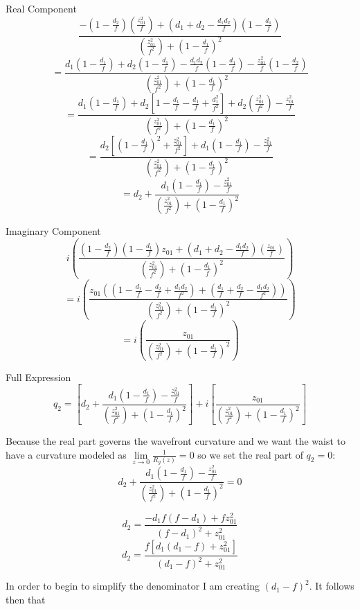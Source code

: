 \documentclass[11pt, letterpaper]{article}
\begin{document}
\begin{enumerate}
\begin{enumerate}
Real Component
$$ \frac{-\left(1-\frac{d_2}{f}\right)\left(\frac{z_{01}^2}{f}\right)+\left(d_1+d_2-\frac{d_1d_2}{f}\right)\left(1-\frac{d_1}{f}\right)}{\left(\frac{z_{01}^2}{f^2}\right)+\left(1-\frac{d_1}{f}\right)^2} $$
$$= \frac{d_1\left(1 - \frac{d_1}{f}\right) + d_2\left(1 - \frac{d_1}{f}\right) - \frac{d_1 d_2}{f}\left(1 - \frac{d_1}{f}\right) - \frac{z_{01}^2}{f}\left(1 - \frac{d_2}{f}\right)}{\left(\frac{z_{01}^2}{f^2}\right)+\left(1-\frac{d_1}{f}\right)^2}$$
$$=\frac{d_1\left(1 - \frac{d_1}{f}\right)+d_2\left[1 - \frac{d_1}{f} - \frac{d_1}{f} + \frac{d_1^2}{f^2}\right] + d_2\left(\frac{z_{01}^2}{f^2}\right) - \frac{z_{01}^2}{f}}{\left(\frac{z_{01}^2}{f^2}\right)+\left(1-\frac{d_1}{f}\right)^2}$$
$$=\frac{d_2\left[\left(1 - \frac{d_1}{f}\right)^2 + \frac{z_{01}^2}{f^2}\right] + d_1\left(1 - \frac{d_1}{f}\right) - \frac{z_{01}^2}{f}}{\left(\frac{z_{01}^2}{f^2}\right)+\left(1-\frac{d_1}{f}\right)^2}$$
$$= d_2 + \frac{d_1\left(1 - \frac{d_1}{f}\right) - \frac{z_{01}^2}{f}}{\left(\frac{z_{01}^2}{f^2}\right)+\left(1-\frac{d_1}{f}\right)^2}$$


Imaginary Component
$$i\left(\frac{\left(1-\frac{d_2}{f}\right)\left(1-\frac{d_1}{f}\right)z_{01}+\left(d_1+d_2-\frac{d_1d_2}{f}\right)\left(\frac{z_{01}}{f}\right)}{\left(\frac{z_{01}^2}{f^2}\right)+\left(1-\frac{d_1}{f}\right)^2}\right)$$
$$=i\left(\frac{z_{01}\left(\left(1-\frac{d_1}{f}-\frac{d_2}{f}+\frac{d_1d_2}{f^2}\right)+\left(\frac{d_1}{f}+\frac{d_2}{f}-\frac{d_1d_2}{f^2}\right)\right)}{\left(\frac{z_{01}^2}{f^2}\right)+\left(1-\frac{d_1}{f}\right)^2}\right)$$
$$=i\left(\frac{z_{01}}{\left(\frac{z_{01}^2}{f^2}\right)+\left(1-\frac{d_1}{f}\right)^2}\right)$$

Full Expression
$$q_2=\left[d_2 + \frac{d_1\left(1 - \frac{d_1}{f}\right) - \frac{z_{01}^2}{f}}{\left(\frac{z_{01}^2}{f^2}\right)+\left(1-\frac{d_1}{f}\right)^2}\right]+i\left[\frac{z_{01}}{\left(\frac{z_{01}^2}{f^2}\right)+\left(1-\frac{d_1}{f}\right)^2}\right]$$


Because the real part governs the wavefront curvature and we want the waist to have a curvature modeled as $\lim\limits_{z \to 0} \frac{1}{R_g(z)}=0$ so we set the real part of $q_2=0$:
$$d_2 + \frac{d_1\left(1 - \frac{d_1}{f}\right) - \frac{z_{01}^2}{f}}{\left(\frac{z_{01}^2}{f^2}\right)+\left(1-\frac{d_1}{f}\right)^2} = 0$$

$$d_2 = \frac{-d_1 f (f - d_1) + f z_{01}^2}{(f - d_1)^2 + z_{01}^2}$$
$$d_2 = \frac{f \left[d_1(d_1 - f) + z_{01}^2\right]}{(d_1 - f)^2 + z_{01}^2}$$

In order to begin to simplify the denominator I am creating $(d_1 - f)^2$. It follows then that


\end{enumerate}
\end{enumerate}
\end{document}
